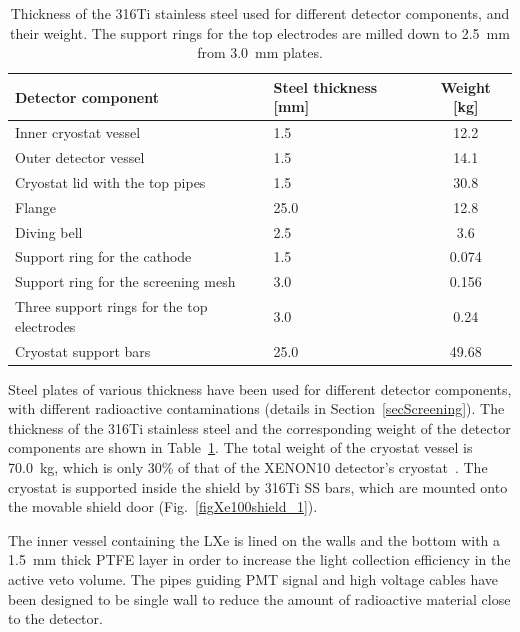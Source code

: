 \begin{table}[!t]
\centering
\caption[Thickness of the 316Ti stainless steel used for different detector components, and their weight]{Thickness of the 316Ti stainless steel used for different detector components, and their weight. The support rings for the top electrodes are milled down to 2.5~mm from 3.0~mm plates.}
\label{tabStainlessSteel}
\vspace{0.2cm}
\begin{tabular}{>{\footnotesize}l|>{\footnotesize}l|>{\footnotesize}c}
\hline
Detector component 					& Steel thickness [mm]		& Weight [kg] \\
\hline
Inner cryostat vessel						& 1.5 					& 12.2 \\
Outer detector vessel					& 1.5						& 14.1 \\
Cryostat lid with the top pipes				& 1.5						& 30.8 \\	
Flange								& 25.0					& 12.8 \\
Diving bell							& 2.5						& 3.6 \\
Support ring for the cathode 				& 1.5						& 0.074 \\
Support ring for the screening mesh			& 3.0						& 0.156 \\
Three support rings for the top electrodes 	& 3.0 					& 0.24 \\
Cryostat support bars					& 25.0					& 49.68 \\
\hline
\end{tabular}
\end{table}

Steel plates of various thickness have been used for different detector components, with different radioactive contaminations (details in Section~\ref{secScreening}). The thickness of the 316Ti stainless steel and the corresponding weight of the detector components are shown in Table~\ref{tabStainlessSteel}. The total weight of the cryostat vessel is 70.0~kg, which is only 30\% of that of the XENON10 detector's cryostat~\cite{xe10-instrument}. 
The cryostat is supported inside the shield by 316Ti SS bars, which are mounted onto the movable shield door (Fig.~\ref{figXe100shield_1}). 

The inner vessel containing the LXe is lined on the walls and the bottom with a 1.5~mm thick PTFE layer  in order to increase the light collection efficiency in the active veto volume. The pipes guiding PMT signal and high voltage cables have been designed to be single wall to reduce the amount of radioactive material close to the detector.

